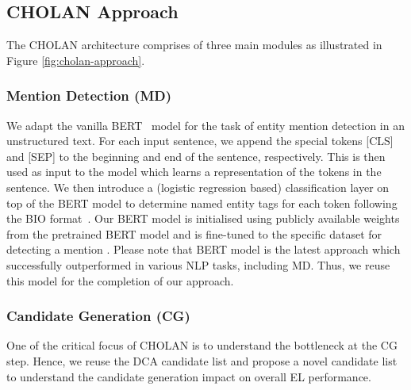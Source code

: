 \documentclass[11pt,a4paper]{article}
\begin{document}
\subsection{CHOLAN Approach} \label{sec:cholan}
The CHOLAN architecture comprises of three main modules as illustrated in Figure \ref{fig:cholan-approach}. 
\subsubsection{Mention Detection (MD)} \label{sec:mention}
We adapt the vanilla BERT~\cite{devlin2019bert} model for the task of entity mention detection in an unstructured text. For each input sentence, we append the special tokens [CLS] and [SEP] to the beginning and end of the sentence, respectively. This is then used as input to the model which learns a representation of the tokens in the sentence. We then introduce a (logistic regression based) classification layer on top of the BERT model to determine named entity tags for each token following the BIO format~\cite{DBLP:journals/corr/cs-CL-0306050}. Our BERT model is initialised using publicly available weights from the pretrained BERT model and is fine-tuned to the specific dataset for detecting a mention . Please note that BERT model is the latest approach which successfully outperformed in various NLP tasks, including MD. Thus, we reuse this model for the completion of our approach. 

\subsubsection{Candidate Generation (CG)} \label{sec:candidate}
One of the critical focus of CHOLAN is to understand the bottleneck at the CG step. Hence, we reuse the DCA candidate list and propose a novel candidate list to understand the candidate generation impact on overall EL performance.
\end{document}
